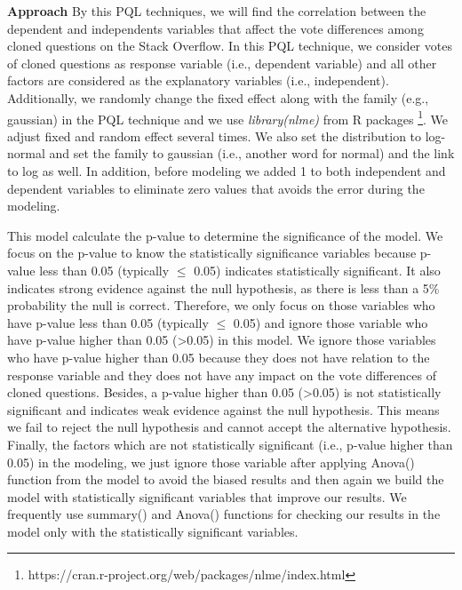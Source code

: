 \documentclass[conference]{IEEEtran}
\begin{document}
\textbf{Approach} By this PQL techniques, we will find the correlation between the dependent and independents variables that affect the vote differences among cloned questions on the Stack Overflow.  In this PQL technique, we consider votes of cloned questions as response variable (i.e., dependent variable) and all other factors are considered as the  explanatory variables (i.e., independent). Additionally,  we randomly change the fixed effect along with the family (e.g., gaussian) in the PQL technique and we use \textit{library(nlme)} from R packages \footnote{https://cran.r-project.org/web/packages/nlme/index.html}. We adjust fixed and random effect several times. We also set the distribution to log-normal and set the family to gaussian (i.e., another word for normal) and the link to log as well. In addition, before modeling we added 1 to both independent and dependent variables to eliminate zero values that avoids the error during the modeling. 

This model calculate the p-value to determine the significance of the model. We focus on the p-value to know the statistically significance variables because p-value less than 0.05 (typically $\leq$ 0.05) indicates statistically significant. It also indicates strong evidence against the null hypothesis, as there is less than a 5\% probability the null is correct. Therefore, we only focus on those variables who have p-value less than 0.05 (typically $\leq$ 0.05) and ignore those variable who have p-value higher than 0.05 (\textgreater 0.05) in this model. We ignore those variables who have p-value higher than 0.05  because they does not have  relation to the response variable and they does not have any impact on the vote differences of cloned questions. Besides, a p-value higher than 0.05 (\textgreater 0.05) is not statistically significant and indicates weak evidence against the null hypothesis. This means we fail to reject the null hypothesis and cannot accept the alternative hypothesis. Finally, the factors which are not statistically significant (i.e., p-value higher than 0.05) in the modeling, we just ignore those variable after applying Anova() function from the model to avoid the biased results and then again we build the model with statistically significant variables that improve our results. We frequently use summary() and Anova() functions for checking our results in the model only with the statistically significant variables. \newline
\end{document}
